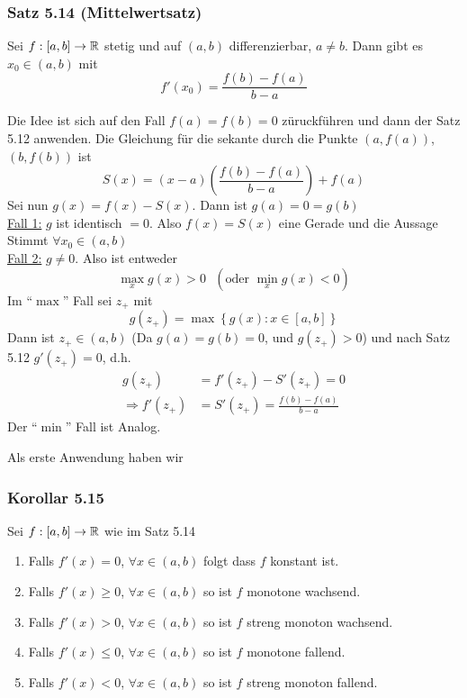 \subsubsection*{Satz 5.14 (Mittelwertsatz)}
Sei $f:\lbrack a,b\rbrack\to\mathbb{R}$ stetig und auf $\left( a,b\right)$ differenzierbar, $a\not=b$. Dann gibt es $x_0\in\left( a,b\right)$ mit \[f'\left( {{x_0}} \right) = \frac{{f\left( b \right) - f\left( a \right)}}{{b - a}}\]

\begin{beweis}{}
Die Idee ist sich auf den Fall $f(a)=f(b)=0$ züruckführen und dann der Satz 5.12 anwenden. Die Gleichung für die sekante durch die Punkte $\left( a,f(a)\right)$, $\left( b,f\left( b\right)\right)$ ist 
\[S\left( x \right) = \left( {x - a} \right)\left( {\frac{{f\left( b \right) - f(a)}}{{b - a}}} \right) + f\left( a \right)\]
Sei nun $g(x)=f(x)-S(x)$. Dann ist $g(a)=0=g(b)$\\

\noindent\underline{Fall 1:} $g$ ist identisch $=0$. Also $f(x)=S(x)$ eine Gerade und die Aussage Stimmt $\forall x_0\in\left( a,b\right)$ \\

\noindent\underline{Fall 2:} $g\not=0$. Also ist entweder 
\[\mathop {\max }\limits_x g(x) > 0\text{ }\left(\text{oder }\mathop {\min }\limits_x g(x) < 0\right)\]
Im ``$\max$'' Fall sei $z_+$ mit 
\[g\left( {{z_ + }} \right) = \max \left\{ {g(x):x \in \left[ {a,b} \right]} \right\}\]
Dann ist $ {{z_ + }} \in\left( a,b\right)$ (Da $g(a)=g(b)=0$, und $g\left( {{z_ + }} \right) >0$) und nach Satz 5.12 $g'\left( z_+\right)=0$, d.h.
\begin{align*}
g\left( {{z_ + }} \right) &= f'\left( {{z_ + }} \right) - S'\left( {{z_ + }} \right) = 0\\
 \Rightarrow f'\left( {{z_ + }} \right) &= S'\left( {{z_ + }} \right) = \frac{{f\left( b \right) - f\left( a \right)}}{{b - a}}
\end{align*}
Der ``$\min$'' Fall ist Analog.
\end{beweis}
Als erste Anwendung haben wir 
\subsubsection*{Korollar 5.15}
Sei $f:\lbrack a,b\rbrack\to\mathbb{R}$ wie im Satz 5.14
\begin{enumerate}
\item Falls $f'(x)=0$, $\forall x\in\left( a,b\right)$ folgt dass $f$ konstant ist.
\item Falls $f'(x)\geq 0$, $\forall x\in\left( a,b\right)$ so ist $f$ monotone wachsend.
\item Falls $f'(x)> 0$, $\forall x\in\left( a,b\right)$ so ist $f$ streng monoton wachsend.
\item Falls $f'(x)\leq 0$, $\forall x\in\left( a,b\right)$ so ist $f$ monotone fallend.
\item Falls $f'(x)< 0$, $\forall x\in\left( a,b\right)$ so ist $f$ streng monoton fallend.
\end{enumerate}

